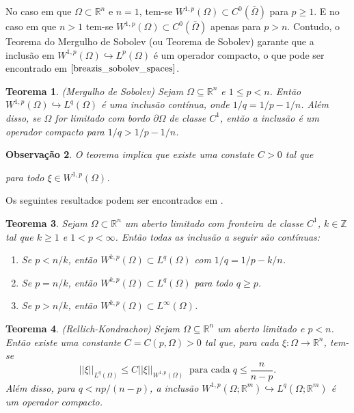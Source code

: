 \documentclass[12pt]{book}
\newtheorem{teorema}{Teorema}[section]
\newtheorem{observacao}[teorema]{Observação}
\newcommand{\espacoLp}[1]{L^{p}(#1)}
\newcommand{\espacoLpGeral}[2]{L^{#1}(#2)}
\newcommand{\espacosobolev}[1]{W^{1,p}(#1)}
\newcommand{\espacosobolevcontradominio}[2]{W^{1,p}(#1;#2)}
\newcommand{\espacosobolevgeneralizado}[1]{W^{k,p}(#1)}
\newcommand{\inteiros}{\mathbb{Z}}
\newcommand{\norma}[1]{||#1||}
\newcommand{\normaLgGeral}[3]{\norma{#1}_{\espacoLpGeral{#2}{#3}}}
\newcommand{\normaWpGeralDominio}[3]{\norma{#1}_{W^{1,#2}(#3)}}
\newcommand{\real}[1]{\mathbb{R}^{#1}}
\begin{document}
	No caso em que $\Omega\subset\real{n}$ e $n=1$, tem-se $\espacosobolev{\Omega} \subset C^{0}(\overline{\Omega})$ para $p \geq 1$. E no caso em que $n>1$ tem-se $\espacosobolev{\Omega} \subset C^{0}(\overline{\Omega})$ apenas para $p>n$. Contudo, o Teorema do Mergulho de Sobolev (ou Teorema de Sobolev) garante que a inclusão em $\espacosobolev{\Omega}\hookrightarrow \espacoLp{\Omega}$ é um operador compacto, o que pode ser encontrado em $\cite{breazis_sobolev_spaces}$.	
	
	\begin{teorema}\label{teorema_sobolev}
		(Mergulho de Sobolev) Sejam $\Omega \subseteq \real{n}$ e $1 \leq p < n$. Então $\espacosobolev{\Omega} \hookrightarrow L^{q}(\Omega)$ é uma inclusão contínua, onde $1/q = 1/p -1/n$. Além disso, se $\Omega$ for limitado com bordo $\partial\Omega$ de classe $C^{1}$, então a inclusão é um operador compacto para $1/q>1/p -1/n$.
	\end{teorema}
	

	\begin{observacao}
		O teorema implica que existe uma constate $C>0$ tal que 
	
		para todo $\xi\in \espacosobolev{\Omega}$.
	\end{observacao}
	
	Os seguintes resultados podem ser encontrados em \cite{audi_floer_homology}.
	
	
	
	\begin{teorema}\label{teorema_inclusao_sobolev}
		Sejam $\Omega \subset\real{n}$ um aberto limitado com fronteira de classe $C^{1}$, $k\in \inteiros$ tal que $k\geq 1$ e $1<p <\infty$. Então todas as inclusão a seguir são contínuas:
		\begin{enumerate}
			\item Se $p<n/k$, então $\espacosobolevgeneralizado{\Omega}\subset \espacoLpGeral{q}{\Omega} $ com $1/q=1/p - k/n$.
			
			\item Se $p=n/k$, então $\espacosobolevgeneralizado{\Omega}\subset \espacoLpGeral{q}{\Omega} $ para todo $q\geq p$.
			
			\item\label{item_tres_teorema_inclusao_sobolev} Se $p>n/k$, então $\espacosobolevgeneralizado{\Omega}\subset \espacoLpGeral{\infty}{\Omega} $.
		\end{enumerate}
	\end{teorema}
	
	\begin{teorema}\label{teorema_rellich}
		(Rellich-Kondrachov) Sejam $\Omega \subseteq \real{n}$ um aberto limitado e $p<n$. Então existe uma constante $C=C(p,\Omega)>0$ tal que, para cada $\xi: \Omega \to \real{n}$, tem-se 
		$$
		\normaLgGeral{\xi}{q}{\Omega} \leq C \normaWpGeralDominio{\xi}{p}{\Omega}\;\;\text{para cada}\; q\leq \frac{n}{n-p}.
		$$
		Além disso, para $q<np/(n-p)$, a inclusão $\espacosobolevcontradominio{\Omega}{\real{m}} \hookrightarrow \espacoLpGeral{q}{\Omega;\real{m}}$ é um operador compacto.
	\end{teorema}
	
\end{document}
